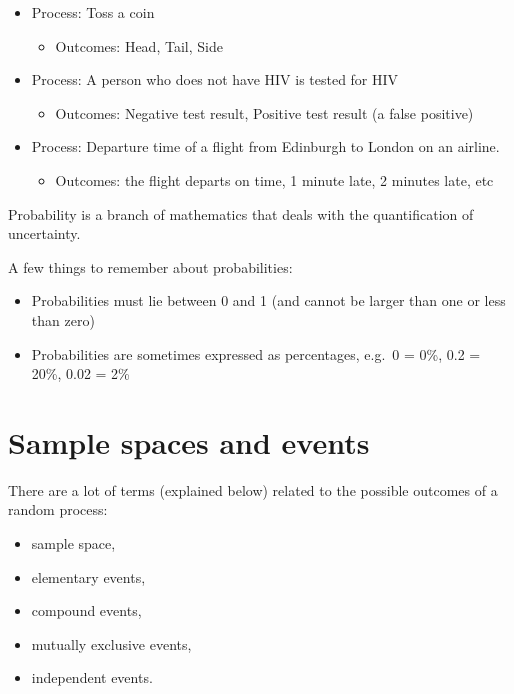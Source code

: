\documentclass[
  oneside]{krantz}
\providecommand{\tightlist}{%
  \setlength{\itemsep}{0pt}\setlength{\parskip}{0pt}}
\begin{document}
\begin{itemize}
\tightlist
\item
  Process: Toss a coin

  \begin{itemize}
  \tightlist
  \item
    Outcomes: Head, Tail, Side
  \end{itemize}
\item
  Process: A person who does not have HIV is tested for HIV

  \begin{itemize}
  \tightlist
  \item
    Outcomes: Negative test result, Positive test result (a false positive)
  \end{itemize}
\item
  Process: Departure time of a flight from Edinburgh to London on an airline.

  \begin{itemize}
  \tightlist
  \item
    Outcomes: the flight departs on time, 1 minute late, 2 minutes late, etc
  \end{itemize}
\end{itemize}

Probability is a branch of mathematics that deals with the quantification of uncertainty.

A few things to remember about probabilities:

\begin{itemize}
\tightlist
\item
  Probabilities must lie between 0 and 1 (and cannot be larger than one or less than zero)
\item
  Probabilities are sometimes expressed as percentages, e.g.~0 = 0\%, 0.2 = 20\%, 0.02 = 2\%
\end{itemize}

\hypertarget{sample-spaces-and-events}{%
\section{Sample spaces and events}\label{sample-spaces-and-events}}

There are a lot of terms (explained below) related to the possible outcomes of a random process:

\begin{itemize}
\tightlist
\item
  sample space,
\item
  elementary events,
\item
  compound events,
\item
  mutually exclusive events,
\item
  independent events.
\end{itemize}
\end{document}

